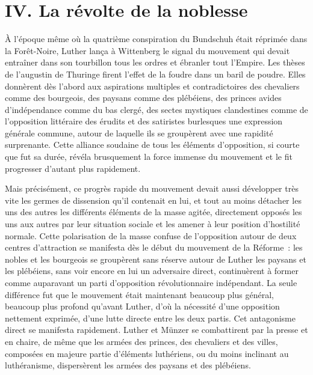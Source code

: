 \documentclass[french,twoside]{book} %
\newcommand\chapteropen{} %
\newcommand\chaptercont{} %
\begin{document}
\chapteropen
\renewcommand{\leftmark}{IV. La révolte de la noblesse}
\chapter[IV. La révolte de la noblesse]{IV. La révolte de la noblesse}

\chaptercont
\noindent À l’époque même où la quatrième conspiration du Bundschuh était réprimée dans la Forêt-Noire, Luther lança à Wittenberg le signal du mouvement qui devait entraîner dans son tourbillon tous les ordres et ébranler tout l’Empire. Les thèses de l’augustin de Thuringe firent l’effet de la foudre dans un baril de poudre. Elles donnèrent dès l’abord aux aspirations multiples et contradictoires des chevaliers comme des bourgeois, des paysans comme des plébéiens, des princes avides d’indépendance comme du bas clergé, des sectes mystiques clandestines comme de l’opposition littéraire des érudits et des satiristes burlesques une expression générale commune, autour de laquelle ils se groupèrent avec une rapidité surprenante. Cette alliance soudaine de tous les éléments d’opposition, si courte que fut sa durée, révéla brusquement la force immense du mouvement et le fit progresser d’autant plus rapidement.\par
Mais précisément, ce progrès rapide du mouvement devait aussi développer très vite les germes de dissension qu’il contenait en lui, et tout au moins détacher les uns des autres les différents éléments de la masse agitée, directement opposés les uns aux autres par leur situation sociale et les amener à leur position d’hostilité normale. Cette polarisation de la masse confuse de l’opposition autour de deux centres d’attraction se manifesta dès le début du mouvement de la Réforme : les nobles et les bourgeois se groupèrent sans réserve autour de Luther les paysans et les plébéiens, sans voir encore en lui un adversaire direct, continuèrent à former comme auparavant un parti d’opposition révolutionnaire indépendant. La seule différence fut que le mouvement était maintenant beaucoup plus général, beaucoup plus profond qu’avant Luther, d’où la nécessité d’une opposition nettement exprimée, d’une lutte directe entre les deux partis. Cet antagonisme direct se manifesta rapidement. Luther et Münzer se combattirent par la presse et en chaire, de même que les armées des princes, des chevaliers et des villes, composées en majeure partie d’éléments luthériens, ou du moins inclinant au luthéranisme, dispersèrent les armées des paysans et des plébéiens.\par
\end{document}
